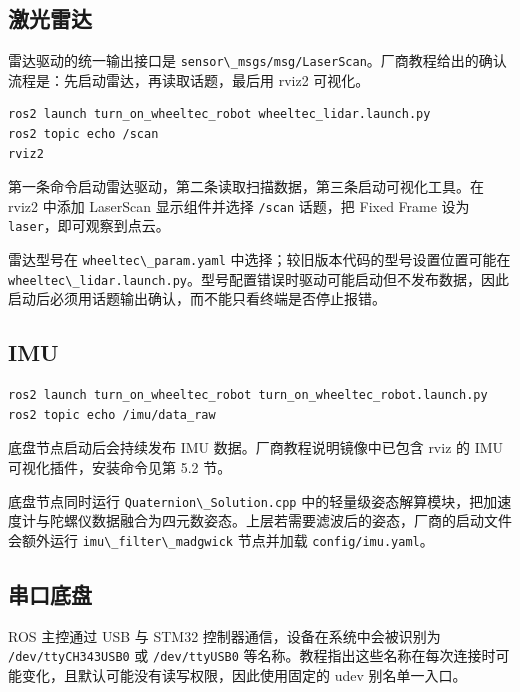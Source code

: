 \subsection{激光雷达}\label{ux6fc0ux5149ux96f7ux8fbe}

雷达驱动的统一输出接口是
\passthrough{\lstinline!sensor\_msgs/msg/LaserScan!}。厂商教程给出的确认流程是：先启动雷达，再读取话题，最后用
rviz2 可视化。

\begin{lstlisting}[language=bash]
ros2 launch turn_on_wheeltec_robot wheeltec_lidar.launch.py
ros2 topic echo /scan
rviz2
\end{lstlisting}

第一条命令启动雷达驱动，第二条读取扫描数据，第三条启动可视化工具。在
rviz2 中添加 LaserScan 显示组件并选择 \passthrough{\lstinline!/scan!}
话题，把 Fixed Frame 设为
\passthrough{\lstinline!laser!}，即可观察到点云。

雷达型号在 \passthrough{\lstinline!wheeltec\_param.yaml!}
中选择；较旧版本代码的型号设置位置可能在
\passthrough{\lstinline!wheeltec\_lidar.launch.py!}。型号配置错误时驱动可能启动但不发布数据，因此启动后必须用话题输出确认，而不能只看终端是否停止报错。

\subsection{IMU}\label{imu}

\begin{lstlisting}[language=bash]
ros2 launch turn_on_wheeltec_robot turn_on_wheeltec_robot.launch.py
ros2 topic echo /imu/data_raw
\end{lstlisting}

底盘节点启动后会持续发布 IMU 数据。厂商教程说明镜像中已包含 rviz 的 IMU
可视化插件，安装命令见第 5.2 节。

底盘节点同时运行 \passthrough{\lstinline!Quaternion\_Solution.cpp!}
中的轻量级姿态解算模块，把加速度计与陀螺仪数据融合为四元数姿态。上层若需要滤波后的姿态，厂商的启动文件会额外运行
\passthrough{\lstinline!imu\_filter\_madgwick!} 节点并加载
\passthrough{\lstinline!config/imu.yaml!}。

\subsection{串口底盘}\label{ux4e32ux53e3ux5e95ux76d8}

ROS 主控通过 USB 与 STM32 控制器通信，设备在系统中会被识别为
\passthrough{\lstinline!/dev/ttyCH343USB0!} 或
\passthrough{\lstinline!/dev/ttyUSB0!}
等名称。教程指出这些名称在每次连接时可能变化，且默认可能没有读写权限，因此使用固定的
udev 别名单一入口。

